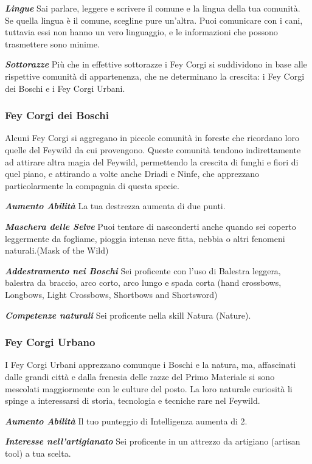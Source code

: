 \textit{\textbf{Lingue}} Sai parlare, leggere e scrivere il comune e la lingua della tua comunità. Se quella lingua è il comune, scegline pure un'altra. Puoi comunicare con i cani, tuttavia essi non hanno un vero linguaggio, e le informazioni che possono trasmettere sono minime.

\textit{\textbf{Sottorazze}} Più che in effettive sottorazze i Fey Corgi si suddividono in base alle rispettive comunità di appartenenza, che ne determinano la crescita: i Fey Corgi dei Boschi e i Fey Corgi Urbani.

\subsubsection{Fey Corgi dei Boschi}
Alcuni Fey Corgi si aggregano in piccole comunità in foreste che ricordano loro quelle del Feywild da cui provengono. Queste comunità tendono indirettamente ad attirare altra magia del Feywild, permettendo la crescita di funghi e fiori di quel piano, e attirando a volte anche Driadi e Ninfe, che apprezzano particolarmente la compagnia di questa specie.

\textit{\textbf{Aumento Abilità}} La tua destrezza aumenta di due punti.

\textit{\textbf{Maschera delle Selve}} Puoi tentare di nasconderti anche quando sei coperto leggermente da fogliame, pioggia intensa neve fitta, nebbia o altri fenomeni naturali.(Mask of the Wild)

\textit{\textbf{Addestramento nei Boschi}} Sei proficente con l'uso di Balestra leggera, balestra da braccio, arco corto, arco lungo e spada corta (hand crossbows, Longbows, Light Crossbows, Shortbows and Shortsword)

\textit{\textbf{Competenze naturali}} Sei proficente nella skill Natura (Nature).

\subsubsection{Fey Corgi Urbano}
I Fey Corgi Urbani apprezzano comunque i Boschi e la natura, ma, affascinati dalle grandi città e dalla frenesia delle razze del Primo Materiale si sono mescolati maggiormente con le culture del posto. La loro naturale curiosità li spinge a interessarsi di storia, tecnologia e tecniche rare nel Feywild.

\textit{\textbf{Aumento Abilità}} Il tuo punteggio di Intelligenza aumenta di 2.

\textit{\textbf{Interesse nell'artigianato}} Sei proficente in un attrezzo da artigiano (artisan tool) a tua scelta.


